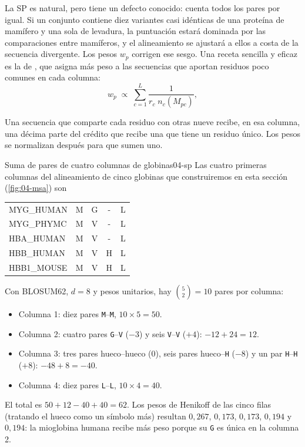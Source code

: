 La SP es natural, pero tiene un defecto conocido: cuenta todos los pares por igual. Si un conjunto contiene diez variantes casi idénticas de una proteína de mamífero y una sola de levadura, la puntuación estará dominada por las comparaciones entre mamíferos, y el alineamiento se ajustará a ellos a costa de la secuencia divergente. Los pesos $w_p$ corrigen ese sesgo. Una receta sencilla y eficaz es la de \textcite{c04-henikoff1994}, que asigna más peso a las secuencias que aportan residuos poco comunes en cada columna:
\begin{equation}\label{eq:04-henikoff}
w_p \;\propto\; \sum_{c=1}^{L}\frac{1}{r_c\;n_c(M_{pc})},
\end{equation}

\begin{simbolos}
\end{simbolos}

\noindent Una secuencia que comparte cada residuo con otras nueve recibe, en esa columna, una décima parte del crédito que recibe una que tiene un residuo único. Los pesos se normalizan después para que sumen uno.

\begin{ejemplo}{Suma de pares de cuatro columnas de globinas}{04-sp}
Las cuatro primeras columnas del alineamiento de cinco globinas que construiremos en esta sección (\cref{fig:04-msa}) son
\begin{center}
\ttfamily\small
\begin{tabular}{@{}l cccc@{}}
MYG\_HUMAN  & M & G & - & L\\
MYG\_PHYMC  & M & V & - & L\\
HBA\_HUMAN  & M & V & - & L\\
HBB\_HUMAN  & M & V & H & L\\
HBB1\_MOUSE & M & V & H & L
\end{tabular}
\end{center}
Con BLOSUM62, $d=8$ y pesos unitarios, hay $\binom52=10$ pares por columna:
\begin{itemize}
  \item Columna 1: diez pares \texttt{M}--\texttt{M}, $10\times5=50$.
  \item Columna 2: cuatro pares \texttt{G}--\texttt{V} ($-3$) y seis \texttt{V}--\texttt{V} ($+4$): $-12+24=12$.
  \item Columna 3: tres pares hueco--hueco (0), seis pares hueco--\texttt{H} ($-8$) y un par \texttt{H}--\texttt{H} ($+8$): $-48+8=-40$.
  \item Columna 4: diez pares \texttt{L}--\texttt{L}, $10\times4=40$.
\end{itemize}
El total es $50+12-40+40=62$. Los pesos de Henikoff de las cinco filas (tratando el hueco como un símbolo más) resultan $0{,}267$, $0{,}173$, $0{,}173$, $0{,}194$ y $0{,}194$: la mioglobina humana recibe más peso porque su \texttt{G} es única en la columna 2.
\end{ejemplo}


